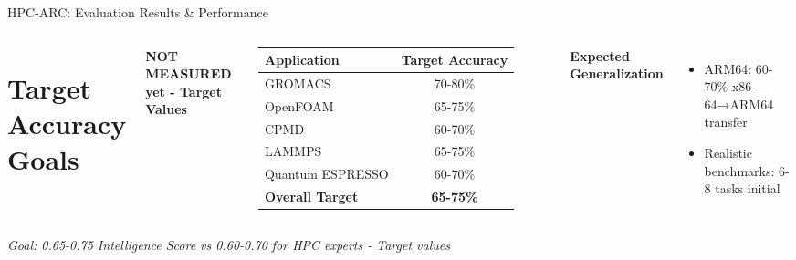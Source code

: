 \documentclass[compress,aspectratio=169]{beamer}
\begin{document}
\begin{frame}{HPC-ARC: Evaluation Results \& Performance}
\begin{columns}[t]
            \section*{Target Accuracy Goals}
            \vspace{0.2em}
            \tiny
            \textcolor{orange!80!black}{\textbf{NOT MEASURED yet - Target Values}}
            \begin{tabular}{lc}
                \toprule
                \textbf{Application} & \textbf{Target Accuracy} \\
                \midrule
                GROMACS & 70-80\% \\
                OpenFOAM & 65-75\% \\
                CPMD & 60-70\% \\
                LAMMPS & 65-75\% \\
                Quantum ESPRESSO & 60-70\% \\
                \midrule
                \textbf{Overall Target} & \textbf{65-75\%} \\
                \bottomrule
            \end{tabular}

            \vspace{0.3em}
            \textbf{Expected Generalization}
            \scriptsize
            \begin{itemize}
                \item ARM64: 60-70\% x86-64→ARM64 transfer
                \item Realistic benchmarks: 6-8 tasks initial
            \end{itemize}
    \end{columns}

\vspace{0.3em}
\centering
\scriptsize \textit{\textcolor{orange!80!black}{Goal: 0.65-0.75 Intelligence Score vs 0.60-0.70 for HPC experts - Target values}}
\end{frame}
\end{document}
